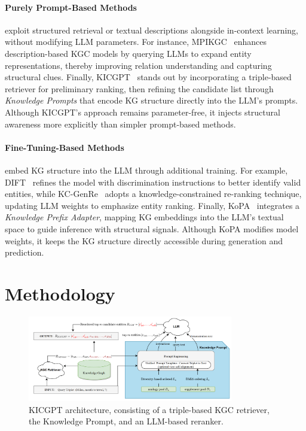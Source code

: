 \documentclass[12pt,a4paper]{article}
\begin{document}
\paragraph{Purely Prompt-Based Methods} exploit structured retrieval or textual descriptions alongside in-context learning, without modifying LLM parameters.
For instance, MPIKGC~\cite{xu2024mpikgc} enhances description-based KGC models by querying LLMs to expand entity representations, thereby improving relation understanding and capturing structural clues.
Finally, KICGPT~\cite{wei2023kicgpt} stands out by incorporating a triple-based retriever for preliminary ranking, then refining the candidate list through \emph{Knowledge Prompts} that encode KG structure directly into the LLM's prompts.
Although KICGPT's approach remains parameter-free, it injects structural awareness more explicitly than simpler prompt-based methods.

\paragraph{Fine-Tuning-Based Methods} embed KG structure into the LLM through additional training.
For example, DIFT~\cite{liu2024dift} refines the model with discrimination instructions to better identify valid entities, while KC-GenRe~\cite{wang2024kcgenre} adopts a knowledge-constrained re-ranking technique, updating LLM weights to emphasize entity ranking.
Finally, KoPA~\cite{qin2023kopa} integrates a \emph{Knowledge Prefix Adapter}, mapping KG embeddings into the LLM's textual space to guide inference with structural signals.
Although KoPA modifies model weights, it keeps the KG structure directly accessible during generation and prediction.


%
%


\section{Methodology}\label{sec:methodology}

\begin{figure}
    \centering
    \includegraphics[width=0.8\textwidth]{figures/KICGPTarchitecture}
    \caption{KICGPT architecture, consisting of a triple-based KGC retriever, the Knowledge Prompt, and an LLM-based reranker.}
    \label{fig:KICGPTarchitecture}
\end{figure}
\end{document}
